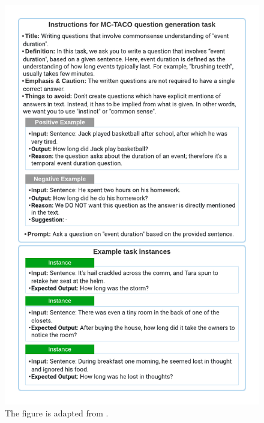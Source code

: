 \begin{figure}[t]
\begin{minipage}[t]{0.48\textwidth}
    \includegraphics[width=1\textwidth]{figures/natural_instruction_fig1_b.pdf}
  \end{minipage}
  \caption{The figure is adapted from \citet{mishra2021cross}.}
  \label{fig:data_natural_instruction}
\end{figure}